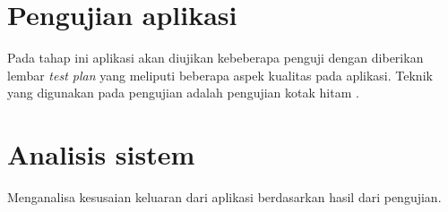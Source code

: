 \section{Pengujian aplikasi}

Pada tahap ini aplikasi akan diujikan kebeberapa penguji dengan diberikan lembar \textit{test plan} yang meliputi beberapa aspek kualitas pada aplikasi. Teknik yang digunakan pada pengujian adalah pengujian kotak hitam \cite{TEST1}.

\section{Analisis sistem}

Menganalisa kesusaian keluaran dari aplikasi berdasarkan hasil dari pengujian.
